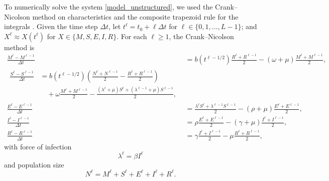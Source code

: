 \documentclass{jpmarticle}
\let\subequationsorig\subequations%
\let\endsubequationsorig\endsubequations%
\renewenvironment{subequations}{
  \subequationsorig
  \renewcommand{\theequation}{\theparentequation.\arabic{equation}}
}{
  \endsubequationsorig
}
\begin{document}
\begin{subequations}
  To numerically solve the system \eqref{model_unstructured}, we used
  the Crank--Nicolson method on characteristics and the composite
  trapezoid rule for the integrals \autocite{milner_1992}.  Given the
  time step $\Delta t$, let
  $t^{\ell} = t_0 + \ell \Delta t$ for $\ell \in \{0, 1, \ldots, L - 1\}$;
  and $X^{\ell} \approx X(t^{\ell})$ for $X \in \{M, S, E, I, R\}$.
  For each $\ell \geq 1$, the Crank--Nicolson method is
  \begin{align}
    \frac{M^{\ell} - M^{\ell - 1}}{\Delta t}
    &=
    b(t^{\ell - 1 / 2})
    \frac{R^{\ell} + R^{\ell - 1}}{2}
    - (\omega + \mu)
    \frac{M^{\ell} + M^{\ell - 1}}{2},
    \\
    \begin{split}
      \frac{S^{\ell} - S^{\ell - 1}}{\Delta t}
      &=
      b(t^{\ell - 1 / 2})
      \left(\frac{N^{\ell} + N^{\ell - 1}}{2}
        - \frac{R^{\ell} + R^{\ell - 1}}{2}\right)
      \\ & \quad {}
      + \omega \frac{M^{\ell} + M^{\ell - 1}}{2}
      - \frac{(\lambda^{\ell} + \mu) S^{\ell}
        + (\lambda^{\ell - 1} + \mu) S^{\ell - 1}}{2},
    \end{split}
    \\
    \frac{E^{\ell} - E^{\ell - 1}}{\Delta t}
    &=
    \frac{\lambda^{\ell} S^{\ell} + \lambda^{\ell - 1} S^{\ell- 1}}{2}
    - (\rho + \mu)
    \frac{E^{\ell} + E^{\ell - 1}}{2},
    \\
    \frac{I^{\ell} - I^{\ell - 1}}{\Delta t}
    &=
    \rho \frac{E^{\ell} + E^{\ell - 1}}{2}
    - (\gamma + \mu) \frac{I^{\ell} + I^{\ell - 1}}{2},
    \\
    \frac{R^{\ell} - R^{\ell - 1}}{\Delta t}
    &=
    \gamma \frac{I^{\ell} + I^{\ell - 1}}{2}
    - \mu \frac{R^{\ell} + R^{\ell - 1}}{2},
  \end{align}
  with force of infection
  \begin{equation}
    \lambda^{\ell} = \beta I^{\ell}
  \end{equation}
  and population size
  \begin{equation}
    N^{\ell} = M^{\ell} + S^{\ell} + E^{\ell} + I^{\ell} + R^{\ell}.
  \end{equation}
\end{subequations}
\end{document}
